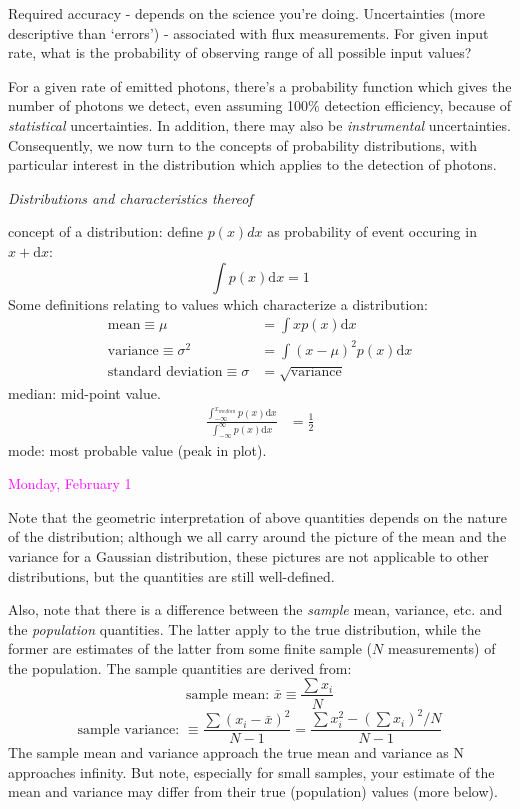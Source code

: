 \documentclass[12pt]{article}
\begin{document}
\textcolor{myBlue}{
Required accuracy - depends on the science you're doing.
Uncertainties (more descriptive than `errors') -
associated with flux measurements.
For given input rate, what is the probability of observing
range of all possible input values?
}

For a given rate of emitted photons, there's a probability function
which gives the number of photons we detect, even assuming 100\%
detection efficiency, because of \emph{statistical} uncertainties. In
addition, there may also be \emph{instrumental} uncertainties. Consequently,
we now turn to the concepts of probability distributions, with
particular interest in the distribution which applies to the detection
of photons.

\emph{Distributions and characteristics thereof}

concept of a distribution: define $p(x)dx$ as probability of
event occuring in $x + \textrm{d}x$:
        $$ \int p(x)\textrm{d}x = 1 $$
Some definitions relating to values which characterize a distribution:
\begin{align*}
    \textrm{mean} \equiv \mu &= \int xp(x)\textrm{d}x \\
    \textrm{variance} \equiv \sigma^2 &= \int (x-\mu)^2 p(x)\textrm{d}x \\
    \textrm{standard\ deviation} \equiv \sigma &= \sqrt{\textrm{variance}}
\end{align*}
median: mid-point value.
\begin{align*}
    \frac{ \int_{-\infty}^{x_{median}} p(x)\textrm{d}x }
    { \int_{-\infty}^{\infty} p(x)\textrm{d}x }
    &= \frac{1}{2}
\end{align*}
mode: most probable value (peak in plot).

\textcolor{magenta}{Monday, February 1}

Note that the geometric interpretation of above quantities
depends on the nature of the distribution; although we all carry
around the picture of the mean and the variance for a Gaussian
distribution, these pictures are not applicable to other
distributions, but the quantities are still well-defined.

Also, note that there is a difference between the
\emph{sample}
mean, variance, etc. and the \emph{population} quantities. The latter apply
to the true distribution, while the former are estimates of the latter
from some finite sample ($N$ measurements) of the population. The sample
quantities are derived from:
$$\textrm{sample\ mean:\ } \bar{x} \equiv \frac{\sum x_i}{N}$$
$$\textrm{sample\ variance:\ } \equiv
  \frac{\sum (x_i-\bar{x})^2}{N-1} =
  \frac{\sum x_i^2-(\sum x_i)^2/N}{N-1}$$
The sample mean and variance approach the true mean and variance as N
approaches infinity. But note, especially for small samples, your
estimate of the mean and variance may differ from their true
(population) values (more below).
\end{document}
